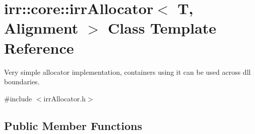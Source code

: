 \hypertarget{classirr_1_1core_1_1irrAllocator}{}\section{irr\+:\+:core\+:\+:irr\+Allocator$<$ T, Alignment $>$ Class Template Reference}
\label{classirr_1_1core_1_1irrAllocator}


Very simple allocator implementation, containers using it can be used across dll boundaries.  




{\ttfamily \#include $<$irr\+Allocator.\+h$>$}

\subsection*{Public Member Functions}
